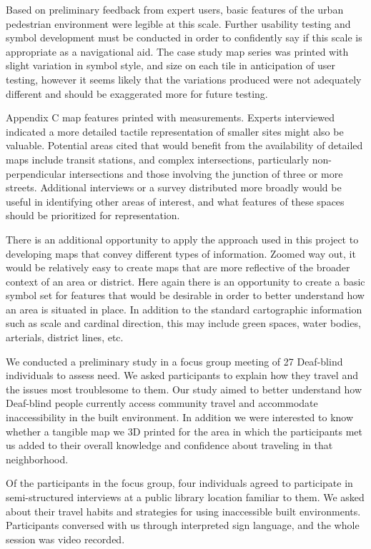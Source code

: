 Based on preliminary feedback from expert users, basic features of the urban pedestrian environment were legible at this scale.  Further usability testing and symbol development must be conducted in order to confidently say if this scale is appropriate as a navigational aid.   The case study map series was printed with slight variation in symbol style, and size on each tile in anticipation of user testing, however it seems likely that the variations produced were not adequately different and should be exaggerated more for future testing.

Appendix C map features printed with measurements.
Experts interviewed indicated a more detailed tactile representation of smaller sites might also be valuable.  Potential areas cited that would benefit from the availability of detailed maps include transit stations, and complex intersections, particularly non-perpendicular intersections and those involving the junction of three or more streets.  Additional interviews or a survey distributed more broadly would be useful in identifying other areas of interest, and what features of these spaces should be prioritized for representation.  

There is an additional opportunity to apply the approach used in this project to developing maps that convey different types of information.  Zoomed way out, it would be relatively easy to create maps that are more reflective of the broader context of an area or district.  Here again there is an opportunity to create a basic symbol set for features that would be desirable in order to better understand how an area is situated in place.  In addition to the standard cartographic information such as scale and cardinal direction, this may include green spaces, water bodies, arterials, district lines, etc.  


We conducted a  preliminary study in a focus group meeting of 27 Deaf-blind individuals to assess need. We asked participants to explain how they travel and the issues most troublesome to them. 
Our study aimed to better understand how Deaf-blind people currently access community travel and 
accommodate inaccessibility in the built environment. In addition we were interested to know whether a tangible map we 3D printed for the area in which the participants met us added to their overall knowledge and confidence about traveling in that neighborhood.


Of the participants in the focus group, four individuals agreed to participate in semi-structured interviews at a public library location familiar to them. We asked about their travel habits and strategies for using inaccessible built environments.
Participants conversed with us through  interpreted sign language, and the whole session was video recorded. %

